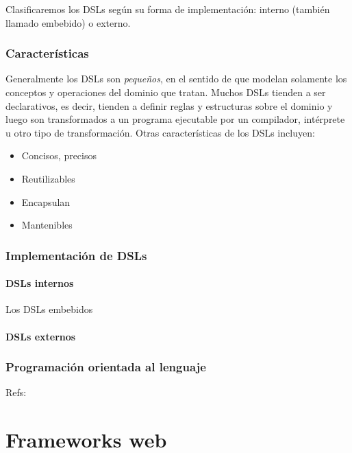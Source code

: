 \documentclass[12pt]{report}
\begin{document}
Clasificaremos los DSLs según su forma de implementación: interno (también llamado embebido) o externo.

\subsection{Caracter\'isticas}

Generalmente los DSLs son \textit{pequeños}, en el sentido de que modelan solamente los conceptos y operaciones del dominio que tratan. Muchos DSLs tienden a ser declarativos, es decir, tienden a definir reglas y estructuras sobre el dominio y luego son transformados a un programa ejecutable por un compilador, intérprete u otro tipo de transformación. 
Otras características de los DSLs incluyen: \cite{van2000domain}

\begin{itemize}
	\item Concisos, precisos
	\item Reutilizables
	\item Encapsulan 
	\item Mantenibles \cite{van1998little}
\end{itemize}



\subsection{Implementaci\'on de DSLs}

\subsubsection{DSLs internos}

Los DSLs embebidos 

\subsubsection{DSLs externos}

\subsection{Programación orientada al lenguaje}

Refs:

\cite{Ward95languageoriented}
\cite{dmitriev2005language}

\chapter{Frameworks web}
\end{document}
